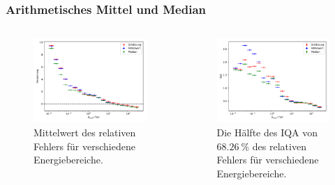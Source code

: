 \documentclass[aspectratio=1610, professionalfonts, 9pt]{beamer}
\begin{document}
  \begin{frame}
    \frametitle{Arithmetisches Mittel und Median}
    \begin{columns}
      \begin{figure}
        \includegraphics[width=\textwidth]{pictures/RF_mean_bias.pdf}
        \caption{Mittelwert des relativen Fehlers für verschiedene Energiebereiche.}
        \label{}
      \end{figure}
      \begin{figure}
        \includegraphics[width=\textwidth]{pictures/RF_mean_resolution.pdf}
        \caption{Die Hälfte des IQA von $\SI{68,26}{\percent}$ des relativen Fehlers für verschiedene Energiebereiche.}
        \label{}
      \end{figure}
    \end{columns}
  \end{frame}
\end{document}

